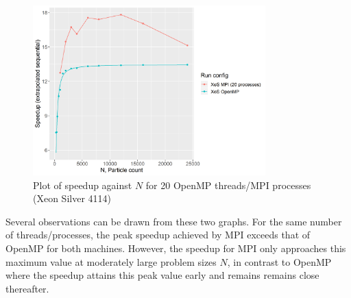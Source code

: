 \documentclass[12pt]{article}
\begin{document}
\begin{figure}[H]
    \centering
    \includegraphics[width=0.8\textwidth]{processedCpuResults/PureXeS-seqSpeedupWithOpenMP.png}
    \caption{Plot of speedup against $N$ for 20 OpenMP threads/MPI processes (Xeon Silver 4114)}
    \label{fig:PureXeS-seqSpeedupWithOpenMP}
\end{figure}

Several observations can be drawn from these two graphs. For the same number of threads/processes, the peak speedup achieved by MPI exceeds that of OpenMP for both machines. However, the speedup for MPI only approaches this maximum value at moderately large problem sizes $N$, in contrast to OpenMP where the speedup attains this peak value early and remains remains close thereafter.\\
\end{document}
